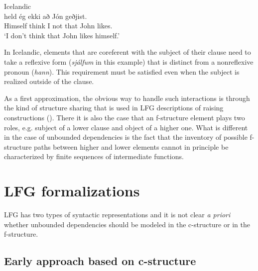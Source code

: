 \documentclass[output=paper,hidelinks]{langscibook}
\begin{document}

\ea \label{refl4}Icelandic\\
 held ég ekki að Jón geðjist.\\  
     Himself think I not that John likes.  \\
\glt `I don't think that John likes himself.'\\
\z

\noindent In Icelandic, elements that are coreferent with the subject of their clause need to take a reflexive form (\textit{sjálfum} in this example) that is distinct from a nonreflexive pronoun (\textit{hann}). This requirement must be satisfied even when the subject is realized outside of the clause.

\hspace*{-4.2pt}As a first approximation, the obvious way to handle such interactions is through the kind of structure sharing that is used in LFG descriptions of raising constructions (). There it is also the case that an f-structure element plays two roles, e.g. subject of a lower clause and object of a higher one. What is different in the case of unbounded dependencies is the fact that the inventory of possible f-structure paths between higher and lower elements cannot in principle be characterized by finite sequences of intermediate functions.

\section{LFG formalizations}\label{formalizations} 

LFG has two types of syntactic representations and it is not clear \emph{a priori} whether unbounded dependencies should be modeled in the c-structure or in the f-struc\-ture.

\subsection{Early approach based on c-structure}\label{early}
\end{document}

